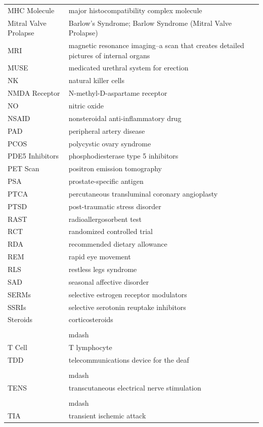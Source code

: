 \begin{longtable}{>{\raggedright\arraybackslash}p{} >{\raggedright\arraybackslash}p{}}
MHC Molecule & major histocompatibility complex molecule \\
Mitral Valve Prolapse & Barlow's Syndrome; Barlow Syndrome (Mitral Valve Prolapse) \\
MRI & magnetic resonance imaging--a scan that creates detailed pictures of internal organs \\
MUSE & medicated urethral system for erection \\
NK & natural killer cells \\
NMDA Receptor & N-methyl-D-aspartame receptor \\
NO & nitric oxide \\
NSAID & nonsteroidal anti-inflammatory drug \\
PAD & peripheral artery disease \\
PCOS & polycystic ovary syndrome \\
PDE5 Inhibitors & phosphodiesterase type 5 inhibitors \\
PET Scan & positron emission tomography \\
PSA & prostate-specific antigen \\
PTCA & percutaneous transluminal coronary angioplasty \\
PTSD & post-traumatic stress disorder \\
RAST & radioallergosorbent test \\
RCT & randomized controlled trial \\
RDA & recommended dietary allowance \\
REM & rapid eye movement \\
RLS & restless legs syndrome \\
SAD & seasonal affective disorder \\
SERMs & selective estrogen receptor modulators \\
SSRIs & selective serotonin reuptake inhibitors \\
Steroids & corticosteroids\\\\&mdash \\
T Cell & T lymphocyte \\
TDD & telecommunications device for the deaf\\\\&mdash \\
TENS & transcutaneous electrical nerve stimulation\\\\&mdash \\
TIA & transient ischemic attack \\

\end{longtable}
